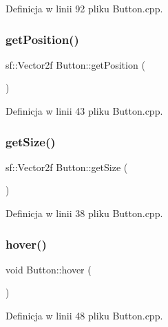 Definicja w linii 92 pliku Button.\+cpp.

\mbox{\label{class_button_aa5acd27eed9dc39a80051436b30ebd41}} 
\subsubsection{\texorpdfstring{get\+Position()}{getPosition()}}
{\footnotesize\ttfamily sf\+::\+Vector2f Button\+::get\+Position (\begin{DoxyParamCaption}{ }\end{DoxyParamCaption})}



Definicja w linii 43 pliku Button.\+cpp.

\mbox{\label{class_button_a0860c867e652f08390c05929d6837c13}} 
\subsubsection{\texorpdfstring{get\+Size()}{getSize()}}
{\footnotesize\ttfamily sf\+::\+Vector2f Button\+::get\+Size (\begin{DoxyParamCaption}{ }\end{DoxyParamCaption})}



Definicja w linii 38 pliku Button.\+cpp.

\mbox{\label{class_button_a1a5ca19ed8efe0ea27625217dcab9f2c}} 
\subsubsection{\texorpdfstring{hover()}{hover()}}
{\footnotesize\ttfamily void Button\+::hover (\begin{DoxyParamCaption}{ }\end{DoxyParamCaption})}



Definicja w linii 48 pliku Button.\+cpp.

\mbox{\label{class_button_acd766bf2e64e1aa93ad4c8a16b343347}} 
